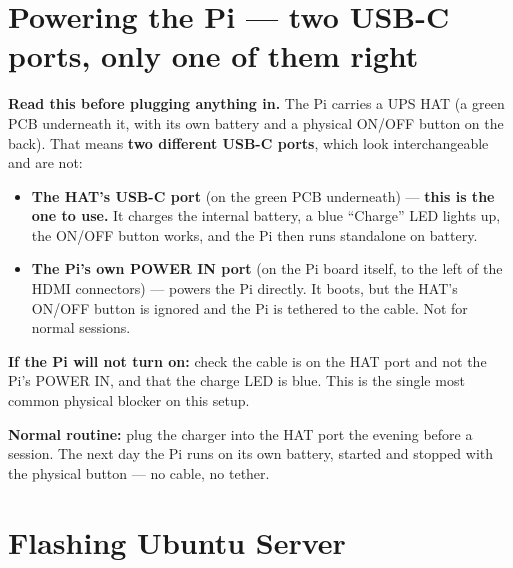 \documentclass[11pt]{report}
\newenvironment{warningbox}%
  {\begin{lrbox}{\warnbox}\begin{minipage}{0.90\textwidth}}%
  {\end{minipage}\end{lrbox}%
   \begin{center}\fcolorbox{black}{codebg}{\usebox{\warnbox}}\end{center}}
\begin{document}
\section{Powering the Pi --- two USB-C ports, only one of them right}
\label{sec:pi-power}

\begin{warningbox}
\textbf{Read this before plugging anything in.} The Pi carries a UPS HAT (a
green PCB underneath it, with its own battery and a physical ON/OFF button
on the back). That means \textbf{two different USB-C ports}, which look
interchangeable and are not:

\begin{itemize}
  \item \textbf{The HAT's USB-C port} (on the green PCB underneath) ---
  \textbf{this is the one to use.} It charges the internal battery, a blue
  ``Charge'' LED lights up, the ON/OFF button works, and the Pi then runs
  standalone on battery.
  \item \textbf{The Pi's own POWER IN port} (on the Pi board itself, to the
  left of the HDMI connectors) --- powers the Pi directly. It boots, but the
  HAT's ON/OFF button is ignored and the Pi is tethered to the cable. Not
  for normal sessions.
\end{itemize}

\textbf{If the Pi will not turn on:} check the cable is on the HAT port and
not the Pi's POWER IN, and that the charge LED is blue. This is the single
most common physical blocker on this setup.
\end{warningbox}

\textbf{Normal routine:} plug the charger into the HAT port the evening
before a session. The next day the Pi runs on its own battery, started and
stopped with the physical button --- no cable, no tether.

\section{Flashing Ubuntu Server}
\end{document}
